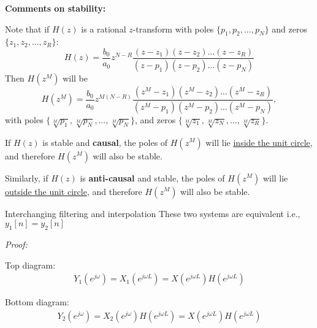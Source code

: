 \documentclass[10pt]{beamer}
\begin{document}
\begin{frame}
\textbf{Comments on stability:}

Note that if $H(z)$ is a rational $z$-transform with poles $\{p_1, p_2, \ldots, p_N\}$ and zeros $\{z_1, z_2, \ldots, z_R\}$:
\begin{equation*}
H(z) = \frac{b_0}{a_0}z^{N-R}\frac{(z-z_1)(z-z_2)\ldots(z-z_R)}{(z-p_1)(z-p_2)\ldots(z-p_N)}
\end{equation*}
Then $H(z^M)$ will be
\begin{equation*}
H(z^M) = \frac{b_0}{a_0}z^{M(N-R)}\frac{(z^M-z_1)(z^M-z_2)\ldots(z^M-z_R)}{(z^M-p_1)(z^M-p_2)\ldots(z^M-p_N)},
\end{equation*}
with poles $\{\sqrt[M]{p_1}, \sqrt[M]{p_N}, \ldots, \sqrt[M]{p_N}\}$, and zeros $\{\sqrt[M]{z_1}, \sqrt[M]{z_N}, \ldots, \sqrt[M]{z_R}\}$.
 
If $H(z)$ is stable and \textbf{causal}, the poles of $H(z^M)$ will lie \underline{inside the unit circle}, and therefore $H(z^M)$ will also be stable.

Similarly, if $H(z)$ is \textbf{anti-causal} and stable, the poles of $H(z^M)$ will lie \underline{outside the unit circle}, and therefore $H(z^M)$ will also be stable.

\end{frame}


\begin{frame}{Interchanging filtering and interpolation}
	These two systems are equivalent i.e., $y_1[n] = y_2[n]$
	\begin{center}
		\resizebox{0.6\linewidth}{!}{}
	\end{center}	
	\textit{Proof:}
	
	Top diagram:
	\begin{align*}
	Y_1(e^{j\omega}) = X_1(e^{j\omega L}) = X(e^{j\omega L})H(e^{j\omega L}) 
	\end{align*}
	
	Bottom diagram:
	\begin{align*}
	Y_2(e^{j\omega}) = X_2(e^{j\omega})H(e^{j\omega L}) = X(e^{j\omega L})H(e^{j\omega L}) 
	\end{align*}
\end{frame}
\end{document}
